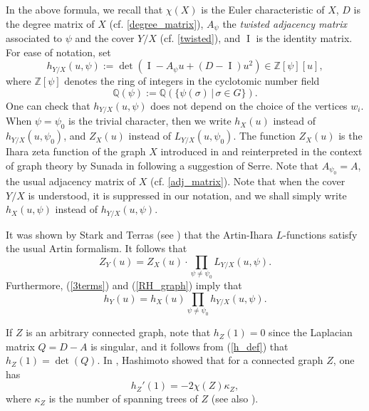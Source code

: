 \documentclass[11pt]{amsart}
\numberwithin{equation}{section}
\theoremstyle{remark}
\newcommand{\Q}{\mathbb{Q}}
\newcommand{\op}[1]{\operatorname{#1}}
\begin{document}
In the above formula, we recall that $\chi(X)$ is the Euler characteristic of $X$, $D$ is the degree matrix of $X$ (cf. \eqref{degree_matrix}), $A_{\psi}$ the \emph{twisted adjacency matrix} associated to $\psi$ and the cover $Y/X$ (cf. \eqref{twisted}), and $\op{I}$ is the identity matrix. For ease of notation, set
\begin{equation} \label{h_def}
h_{Y/X}(u,\psi) :=  \op{det}\left(\op{I} - A_{\psi}u + (D-\op{I})u^{2}\right) \in \mathbb{Z}[\psi][u],
\end{equation}
where $\mathbb{Z}[\psi]$ denotes the ring of integers in the cyclotomic number field 
$$\Q(\psi) := \mathbb{Q}(\{\psi(\sigma)\, | \, \sigma \in G\}).$$  
One can check that $h_{Y/X}(u,\psi)$ does not depend on the choice of the vertices $w_{i}$.  When $\psi = \psi_{0}$ is the trivial character, then we write $h_{X}(u)$ instead of $h_{Y/X}(u,\psi_{0})$, and $Z_{X}(u)$ instead of $L_{Y/X}(u,\psi_{0})$.  The function $Z_{X}(u)$ is the Ihara zeta function of the graph $X$ introduced in \cite{Ihara:1966} and reinterpreted in the context of graph theory by Sunada in \cite{Sunada:1986} following a suggestion of Serre.  Note that $A_{\psi_{0}} = A$, the usual adjacency matrix of $X$ (cf. \eqref{adj_matrix}). Note that when the cover $Y/X$ is understood, it is suppressed in our notation, and we shall simply write $h_X(u, \psi)$ instead of $h_{Y/X}(u, \psi)$.

It was shown by Stark and Terras (see \cite[Proposition 3]{Stark/Terras:2000}) that the Artin-Ihara $L$-functions satisfy the usual Artin formalism.  It follows that
$$Z_{Y}(u) = Z_{X}(u) \cdot \prod_{\psi \neq \psi_{0}}L_{Y/X}(u,\psi). $$
Furthermore, (\ref{3terms}) and (\ref{RH_graph}) imply that
\begin{equation} \label{prod_dec}
h_{Y}(u) = h_{X}(u) \prod_{\psi \neq \psi_{0}}h_{Y/X}(u,\psi). 
\end{equation}

If $Z$ is an arbitrary connected graph, note that $h_{Z}(1) = 0$ since the Laplacian matrix $Q = D - A$ is singular, and it follows from (\ref{h_def}) that $h_{Z}(1) = \op{det}(Q)$.  In \cite{Hashimoto:1990}, Hashimoto showed that for a connected graph $Z$, one has
\begin{equation} \label{sp_val}
h_{Z}'(1) = -2 \chi(Z) \kappa_{Z}, 
\end{equation}
where $\kappa_{Z}$ is the number of spanning trees of $Z$ (see also \cite{Northshield:1998}).
\end{document}

